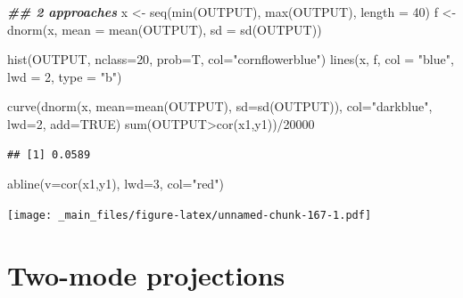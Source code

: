 \documentclass[
  notitlepage,
  onecolumn,
  openany]{book}
\newenvironment{Shaded}{\begin{snugshade}}{\end{snugshade}}
\newcommand{\AttributeTok}[1]{\textcolor[rgb]{0.77,0.63,0.00}{#1}}
\newcommand{\ConstantTok}[1]{\textcolor[rgb]{0.00,0.00,0.00}{#1}}
\newcommand{\DecValTok}[1]{\textcolor[rgb]{0.00,0.00,0.81}{#1}}
\newcommand{\DocumentationTok}[1]{\textcolor[rgb]{0.56,0.35,0.01}{\textbf{\textit{#1}}}}
\newcommand{\FunctionTok}[1]{\textcolor[rgb]{0.00,0.00,0.00}{#1}}
\newcommand{\NormalTok}[1]{#1}
\newcommand{\OtherTok}[1]{\textcolor[rgb]{0.56,0.35,0.01}{#1}}
\newcommand{\SpecialCharTok}[1]{\textcolor[rgb]{0.00,0.00,0.00}{#1}}
\newcommand{\StringTok}[1]{\textcolor[rgb]{0.31,0.60,0.02}{#1}}
\begin{document}
\begin{Shaded}
\begin{Highlighting}[]
\DocumentationTok{\#\# 2 approaches}
\NormalTok{x }\OtherTok{\textless{}{-}} \FunctionTok{seq}\NormalTok{(}\FunctionTok{min}\NormalTok{(OUTPUT), }\FunctionTok{max}\NormalTok{(OUTPUT), }\AttributeTok{length =} \DecValTok{40}\NormalTok{)}
\NormalTok{f }\OtherTok{\textless{}{-}} \FunctionTok{dnorm}\NormalTok{(x, }\AttributeTok{mean =} \FunctionTok{mean}\NormalTok{(OUTPUT), }\AttributeTok{sd =} \FunctionTok{sd}\NormalTok{(OUTPUT))}

\FunctionTok{hist}\NormalTok{(OUTPUT, }\AttributeTok{nclass=}\DecValTok{20}\NormalTok{, }\AttributeTok{prob=}\NormalTok{T, }\AttributeTok{col=}\StringTok{"cornflowerblue"}\NormalTok{)}
\FunctionTok{lines}\NormalTok{(x, f, }\AttributeTok{col =} \StringTok{"blue"}\NormalTok{, }\AttributeTok{lwd =} \DecValTok{2}\NormalTok{, }\AttributeTok{type =} \StringTok{"b"}\NormalTok{)}

\FunctionTok{curve}\NormalTok{(}\FunctionTok{dnorm}\NormalTok{(x, }\AttributeTok{mean=}\FunctionTok{mean}\NormalTok{(OUTPUT), }\AttributeTok{sd=}\FunctionTok{sd}\NormalTok{(OUTPUT)), }
      \AttributeTok{col=}\StringTok{"darkblue"}\NormalTok{, }\AttributeTok{lwd=}\DecValTok{2}\NormalTok{, }\AttributeTok{add=}\ConstantTok{TRUE}\NormalTok{)}
\FunctionTok{sum}\NormalTok{(OUTPUT}\SpecialCharTok{\textgreater{}}\FunctionTok{cor}\NormalTok{(x1,y1))}\SpecialCharTok{/}\DecValTok{20000}
\end{Highlighting}
\end{Shaded}

\begin{verbatim}
## [1] 0.0589
\end{verbatim}

\begin{Shaded}
\begin{Highlighting}[]
\FunctionTok{abline}\NormalTok{(}\AttributeTok{v=}\FunctionTok{cor}\NormalTok{(x1,y1), }\AttributeTok{lwd=}\DecValTok{3}\NormalTok{, }\AttributeTok{col=}\StringTok{"red"}\NormalTok{)}
\end{Highlighting}
\end{Shaded}

\texttt{[image: \_main\_files/figure-latex/unnamed-chunk-167-1.pdf]}

\hypertarget{two-mode-projections}{%
\chapter{Two-mode projections}\label{two-mode-projections}}
\end{document}
